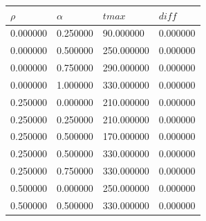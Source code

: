 \documentclass[12pt]{report}
\begin{document}
\begin{center}
	\begin{table}[h!]
		\begin{center}
			\begin{tabular}{|llll|}
				\hline
				\multicolumn{1}{|l|}{$\rho$}                              & \multicolumn{1}{l|}{$\alpha$} & \multicolumn{1}{l|}{$tmax$} & $diff$     \\ \hline
				0.000000 & 0.250000                   & 90.000000                 & 0.000000 \\

				0.000000                                              & 0.500000                   & 250.000000                & 0.000000 \\

				0.000000                                              & 0.750000                   & 290.000000                & 0.000000 \\

				0.000000                                              & 1.000000                   & 330.000000                & 0.000000 \\

				0.250000                                              & 0.000000                   & 210.000000                & 0.000000 \\

				0.250000                                              & 0.250000                   & 210.000000                & 0.000000 \\

				0.250000                                              & 0.500000                   & 170.000000                & 0.000000 \\

				0.250000                                              & 0.500000                   & 330.000000                & 0.000000 \\

				0.250000                                              & 0.750000                   & 330.000000                & 0.000000 \\

				0.500000                                              & 0.000000                   & 250.000000                & 0.000000 \\
 
				0.500000                                              & 0.500000                   & 330.000000                & 0.000000 \\


\end{tabular}
\end{center}
\end{table}
\end{center}
\end{document}
